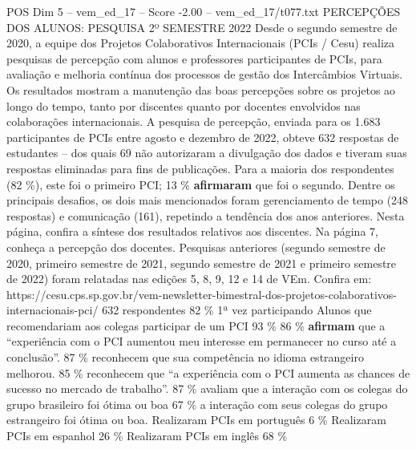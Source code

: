 \begin{textsample}{POS Dim 5 – vem\_ed\_17 – Score -2.00 – vem\_ed\_17/t077.txt}  \label{ex:f5_pos_141}
PERCEPÇÕES DOS ALUNOS: PESQUISA 2º SEMESTRE 2022 Desde o segundo semestre de 2020, a equipe dos Projetos Colaborativos Internacionais (PCIs / Cesu) realiza pesquisas de percepção com alunos e professores participantes de PCIs, para avaliação e melhoria contínua dos processos de gestão dos Intercâmbios Virtuais.
Os resultados mostram a manutenção das boas percepções sobre os projetos ao longo do tempo, tanto por discentes quanto por docentes envolvidos nas colaborações internacionais.
A pesquisa de percepção, enviada para os 1.683 participantes de PCIs entre agosto e dezembro de 2022, obteve 632 respostas de estudantes – dos quais 69 não autorizaram a divulgação dos dados e tiveram suas respostas eliminadas para fins de publicações.
Para a maioria dos respondentes (82 \%), este foi o primeiro PCI; 13 \% \textbf{afirmaram} que foi o segundo.
Dentre os principais desafios, os dois mais mencionados foram gerenciamento de tempo (248 respostas) e comunicação (161), repetindo a tendência dos anos anteriores.
Nesta página, confira a síntese dos resultados relativos aos discentes.
Na página 7, conheça a percepção dos docentes.
Pesquisas anteriores (segundo semestre de 2020, primeiro semestre de 2021, segundo semestre de 2021 e primeiro semestre de 2022) foram relatadas nas edições 5, 8, 9, 12 e 14 de VEm.
Confira em: https://cesu.cps.sp.gov.br/vem-newsletter-bimestral-dos-projetos-colaborativos-internacionais-pci/ 632 respondentes 82 \% 1ª vez participando Alunos que recomendariam aos colegas participar de um PCI 93 \% 86 \% \textbf{afirmam} que a “experiência com o PCI aumentou meu interesse em permanecer no curso até a conclusão”. 87 \% reconhecem que sua competência no idioma estrangeiro melhorou. 85 \% reconhecem que “a experiência com o PCI aumenta as chances de sucesso no mercado de trabalho”. 87 \% avaliam que a interação com os colegas do grupo brasileiro foi ótima ou boa 67 \% a interação com seus colegas do grupo estrangeiro foi ótima ou boa.
Realizaram PCIs em português 6 \% Realizaram PCIs em espanhol 26 \% Realizaram PCIs em inglês 68 \%

\end{textsample}
